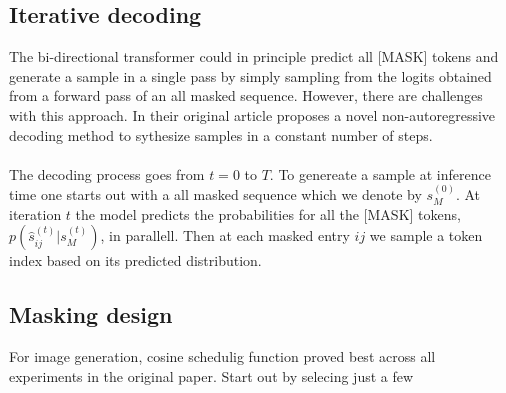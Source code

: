 \documentclass[../../thesis.tex]{subfiles}
\begin{document}
\subsection{Iterative decoding}

The bi-directional transformer could in principle predict all [MASK] tokens and generate a sample in a single pass by simply sampling from the logits obtained from a forward pass of an all masked sequence. However, there are challenges with this approach. In their original article  \cite{chang2022maskgit} proposes a novel non-autoregressive decoding method to sythesize samples in a constant number of steps.\\\\

The decoding process goes from $t = 0$ to $T$. To genereate a sample at inference time one starts out with a all masked sequence which we denote by $s_M^{(0)}$. At iteration $t$ the model predicts the probabilities for all the [MASK] tokens, $p(\hat{s}_{ij}^{(t)}|s_M^{(t)})$, in parallell. Then at each masked entry $ij$ we sample a token index based on its predicted distribution.  

\subsection{Masking design}

For image generation, cosine schedulig function proved best across all experiments in the original paper. Start out by selecing just a few 
\end{document}
